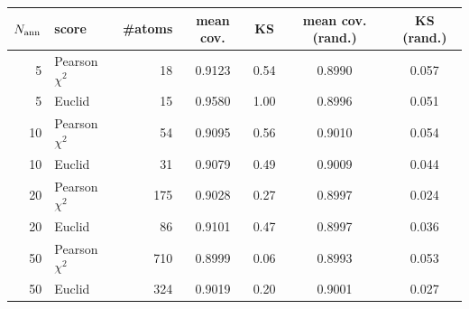 \begin{tabular}{rlrcccc}\toprule
$N_{\rm ann}$ & score & \#atoms & mean cov. & KS & mean cov. (rand.) & KS (rand.)\\\midrule
5 & Pearson $\chi^2$ & 18 & 0.9123 & 0.54 & 0.8990 & 0.057\\
5 & Euclid & 15 & 0.9580 & 1.00 & 0.8996 & 0.051\\
10 & Pearson $\chi^2$ & 54 & 0.9095 & 0.56 & 0.9010 & 0.054\\
10 & Euclid & 31 & 0.9079 & 0.49 & 0.9009 & 0.044\\
20 & Pearson $\chi^2$ & 175 & 0.9028 & 0.27 & 0.8997 & 0.024\\
20 & Euclid & 86 & 0.9101 & 0.47 & 0.8997 & 0.036\\
50 & Pearson $\chi^2$ & 710 & 0.8999 & 0.06 & 0.8993 & 0.053\\
50 & Euclid & 324 & 0.9019 & 0.20 & 0.9001 & 0.027\\
\bottomrule\end{tabular}
